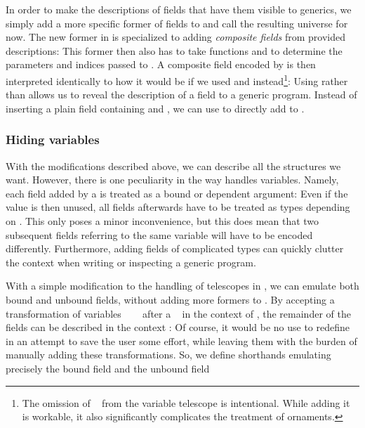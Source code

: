 In order to make the descriptions of fields that have them visible to generics, we simply add a more specific former of fields to  and call the resulting universe  for now. The new former  in  is specialized to adding \emph{composite fields} from provided descriptions:
This former then also has to take functions  and  to determine the parameters and indices passed to . A composite field encoded by  is then interpreted identically to how it would be if we used  and  instead\footnote{The omission of \  from the variable telescope is intentional. While adding it is workable, it also significantly complicates the treatment of ornaments.}:
Using  rather than  allows us to reveal the description of a field to a generic program. Instead of inserting a plain field containing  and , we can use  to directly add  to .

\subsubsection{Hiding variables}
With the modifications described above, we can describe all the structures we want. However, there is one peculiarity in the way  handles variables. Namely, each field  added by a  is treated as a bound or dependent argument: Even if the value  is then unused, all fields afterwards have to be treated as types depending on . This only poses a minor inconvenience, but this does mean that two subsequent fields referring to the same variable will have to be encoded differently. Furthermore, adding fields of complicated types can quickly clutter the context when writing or inspecting a generic program.

With a simple modification to the handling of telescopes in , we can emulate both bound and unbound fields, without adding more formers to . By accepting a transformation of variables \ \ \  after a \  in the context of , the remainder of the fields can be described in the context :
Of course, it would be no use to redefine  in an attempt to save the user some effort, while leaving them with the burden of manually adding these transformations. So, we define shorthands emulating precisely the bound field
and the unbound field


